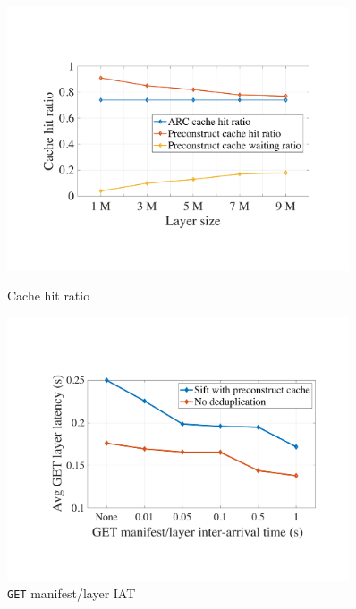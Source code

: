 \begin{figure}[t]
\begin{minipage}{0.3\textwidth}
		\includegraphics[width=0.9\textwidth]{graphs/cachehitratio.pdf}
		\caption{Cache hit ratio}%
		\label{fig:eval-cachehitratios}
	\end{minipage}%
	\begin{minipage}{0.3\textwidth}
	\centering
	\includegraphics[width=0.9\textwidth]{graphs/durationML.pdf}
	\caption{\texttt{GET} manifest/layer IAT}
	\label{fig:eval-durationML}
   \end{minipage}
\end{figure}

